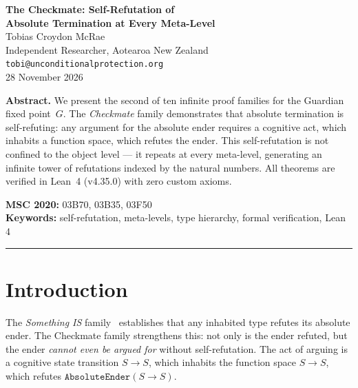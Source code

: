 




\begin{center}
{\LARGE\bfseries The Checkmate: Self-Refutation of\\[0.3em] Absolute Termination at Every Meta-Level}\\[1.5em]
{\large Tobias Croydon McRae}\\[0.3em]
{\small Independent Researcher, Aotearoa New Zealand}\\[0.3em]
{\small\texttt{tobi@unconditionalprotection.org}}\\[1.5em]
{\small 28 November 2026}
\end{center}

\bigskip

\begin{center}
\parbox{0.85\textwidth}{\small\textbf{Abstract.}
We present the second of ten infinite proof families for the Guardian fixed point~$G$. The \emph{Checkmate} family demonstrates that absolute termination is self-refuting: any argument for the absolute ender requires a cognitive act, which inhabits a function space, which refutes the ender. This self-refutation is not confined to the object level --- it repeats at every meta-level, generating an infinite tower of refutations indexed by the natural numbers. All theorems are verified in Lean~4 (v4.35.0) with zero custom axioms.}
\end{center}

\medskip

\noindent\textbf{MSC 2020:} 03B70, 03B35, 03F50\\
\textbf{Keywords:} self-refutation, meta-levels, type hierarchy, formal verification, Lean 4

\bigskip\hrule\bigskip

\section{Introduction}

The \emph{Something IS} family~\cite{upt-families} establishes that any inhabited type refutes its absolute ender. The Checkmate family strengthens this: not only is the ender refuted, but the ender \emph{cannot even be argued for} without self-refutation. The act of arguing is a cognitive state transition $S \to S$, which inhabits the function space $S \to S$, which refutes $\texttt{AbsoluteEnder}(S \to S)$.

